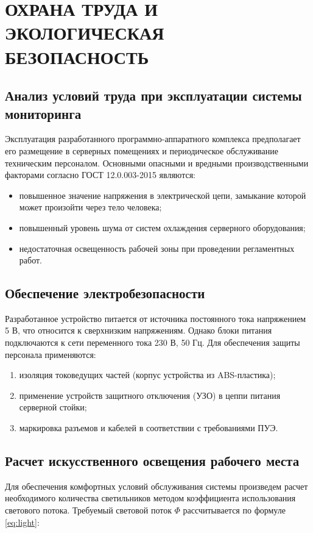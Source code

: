 \chapter{ОХРАНА ТРУДА И ЭКОЛОГИЧЕСКАЯ БЕЗОПАСНОСТЬ}

\section{Анализ условий труда при эксплуатации системы мониторинга}

Эксплуатация разработанного программно-аппаратного комплекса предполагает его размещение в серверных помещениях и периодическое обслуживание техническим персоналом. Основными опасными и вредными производственными факторами согласно ГОСТ 12.0.003-2015 являются:
\begin{itemize}
    \item повышенное значение напряжения в электрической цепи, замыкание которой может произойти через тело человека;
    \item повышенный уровень шума от систем охлаждения серверного оборудования;
    \item недостаточная освещенность рабочей зоны при проведении регламентных работ.
\end{itemize}

\section{Обеспечение электробезопасности}

Разработанное устройство питается от источника постоянного тока напряжением 5 В, что относится к сверхнизким напряжениям. Однако блоки питания подключаются к сети переменного тока 230 В, 50 Гц. Для обеспечения защиты персонала применяются:
\begin{enumerate}
    \item изоляция токоведущих частей (корпус устройства из ABS-пластика);
    \item применение устройств защитного отключения (УЗО) в цеппи питания серверной стойки;
    \item маркировка разъемов и кабелей в соответствии с требованиями ПУЭ.
\end{enumerate}

\section{Расчет искусственного освещения рабочего места}

Для обеспечения комфортных условий обслуживания системы произведем расчет необходимого количества светильников методом коэффициента использования светового потока. Требуемый световой поток $\Phi$ рассчитывается по формуле \eqref{eq:light}:


